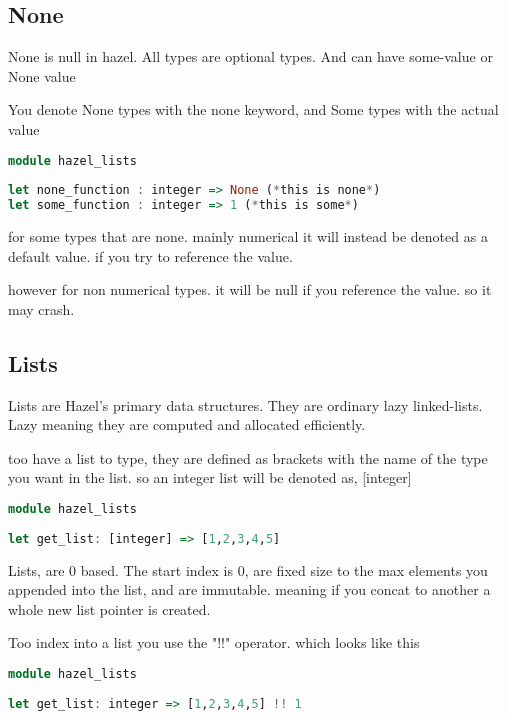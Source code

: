 \documentclass{article}
\begin{document}
\subsection{None}

None is null in hazel. All types are optional types. And can have some-value or None value 

You denote None types with the none keyword, and Some types with the actual value

\begin{lstlisting}[language=Haskell, caption=How Lists are defined in hazel]
module hazel_lists
        
let none_function : integer => None (*this is none*)
let some_function : integer => 1 (*this is some*)

\end{lstlisting}

for some types that are none. mainly numerical it will instead be denoted as a default value. if you try to reference the value. 

however for non numerical types. it will be null if you reference the value. so it may crash. 

\subsection{Lists}

Lists are Hazel's primary data structures. They are ordinary lazy linked-lists. Lazy meaning they are computed and allocated efficiently.  

too have a list to type, they are defined as brackets with the name of the type you want in the list. so an integer list will be denoted as, [integer]

\begin{lstlisting}[language=Haskell]
module hazel_lists
        
let get_list: [integer] => [1,2,3,4,5]
\end{lstlisting}

Lists, are 0 based. The start index is 0, are fixed size to the max elements you appended into the list, and are immutable. meaning if you concat to another a whole new list pointer is created.

Too index into a list you use the "!!" operator. which looks like this

\begin{lstlisting}[language=Haskell]
module hazel_lists
        
let get_list: integer => [1,2,3,4,5] !! 1
\end{lstlisting}
\end{document}
